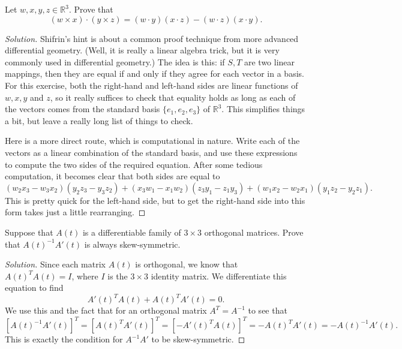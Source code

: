 \documentclass[Shifrin_Solutions_Spring_2015.tex]{subfiles}
\begin{document}
\vspace{1cm}



\begin{exercise} Let $w, x, y, z \in \mathbb{R}^3$. Prove that
\[
(w \times x) \cdot (y \times z) = (w\cdot y)(x \cdot z) - (w\cdot z)(x\cdot y).
\]
\end{exercise}

\begin{proof}[Solution] Shifrin's hint is about a common proof technique from more advanced differential geometry. (Well, it is really a linear algebra trick, but it is very commonly used in differential geometry.) The idea is this: if $S, T$ are two linear mappings, then they are equal if and only if they agree for each vector in a basis. For this exercise, both the right-hand and left-hand sides are linear functions of $w, x, y$ and $z$, so it really suffices to check that equality holds as long as each of the vectors comes from the standard basis $\{e_1, e_2, e_3 \}$ of $\mathbb{R}^3$. This simplifies things a bit, but leave a really long list of things to check.

Here is a more direct route, which is computational in nature. Write each of the vectors as a linear combination of the standard basis, and use these expressions to compute the two sides of the required equation. After some tedious computation, it becomes clear that both sides are equal to
\[
(w_2 x_3 - w_3 x_2) ( y_2 z_3 - y_3z_2 ) + (x_3 w_1 - x_1 w_2) (z_3 y_1 - z_1 y_3) + (w_1x_2 - w_2 x_1) (y_1z_2 - y_2 z_1) .
\]
This is pretty quick for the left-hand side, but to get the right-hand side into this form takes just a little rearranging.
\end{proof}


\vspace{1cm}


\begin{exercise} Suppose that $A(t)$ is a differentiable family of $3\times 3$ orthogonal matrices. Prove that ${A(t)}^{-1}A'(t)$ is always skew-symmetric.
\end{exercise}

\begin{proof}[Solution]
Since each matrix $A(t)$ is orthogonal, we know that $ {A(t)}^T A(t)= I$, where $I$ is the $3\times 3$ identity matrix. We differentiate this equation to find
\[
 {A'(t)}^T A(t)  + {A(t)}^T A'(t) = 0 .
\]
We use this and the fact that for an orthogonal matrix $A^T = A^{-1}$ to see that
\[
[{A(t)}^{-1} A'(t) ]^T = [ {A(t)}^T A'(t)]^T = [- {A'(t)}^T A(t) ]^T = - {A(t)}^T A'(t) = - {A(t)}^{-1} A'(t) .
\]
This is exactly the condition for $A^{-1}A'$ to be skew-symmetric.
\end{proof}
\end{document}
